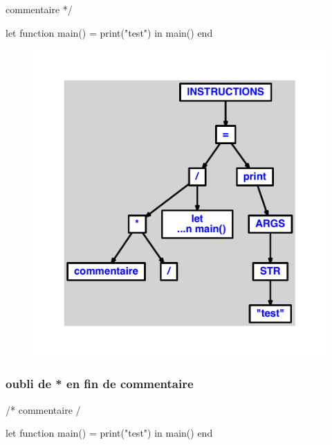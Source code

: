 \documentclass{article}
\begin{document}
\begin{verbatimtab}
commentaire */

let
	function main() = print("test")
in main() end
\end{verbatimtab}
\begin{figure}[H]\centering\includegraphics[max width=\textwidth]{ast/ast_146.pdf}\end{figure}\subsubsection{oubli de * en fin de commentaire}
\begin{verbatimtab}
/* commentaire /

let
	function main() = print("test")
in main() end
\end{verbatimtab}
\end{document}
